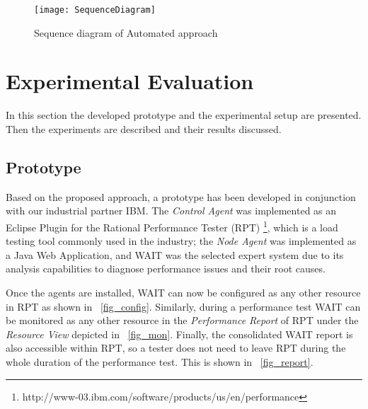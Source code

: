 \documentclass[runningheads,a4paper]{llncs}
\begin{document}
\vspace{-5pt}
\begin{figure}[!h]
\centering
\texttt{[image: SequenceDiagram]}
\caption{Sequence diagram of Automated approach}
\label{fig_SeqDiagram}
\end{figure}
\vspace{-5pt}

\vspace{5pt}
\section{Experimental Evaluation}
\label{ExperimentalEvaluation}
\vspace{-5pt}

In this section the developed prototype and the experimental setup are
presented. Then the experiments are described and their results discussed.

\subsection{Prototype}

Based on the proposed approach, a prototype has been developed in
conjunction with our industrial partner IBM. The \emph{Control Agent} was
implemented as an Eclipse Plugin for the Rational Performance Tester (RPT)
\footnote{http://www-03.ibm.com/software/products/us/en/performance}, which is a
load testing tool commonly used in the industry; the \emph{Node Agent} was
implemented as a Java Web Application, and WAIT was the selected expert system
due to its analysis capabilities to diagnose performance issues and their root
causes.

Once the agents are installed, WAIT can now be configured as any other resource
in RPT as shown in \figurename ~\ref{fig_config}. Similarly, during a
performance test WAIT can be monitored as any other resource in the
\emph{Performance Report} of RPT under the \emph{Resource View} depicted in
\figurename ~\ref{fig_mon}. Finally, the consolidated WAIT report is also
accessible within RPT, so a tester does not need to leave RPT during the whole
duration of the performance test. This is shown in \figurename ~\ref{fig_report}.

\end{document}
